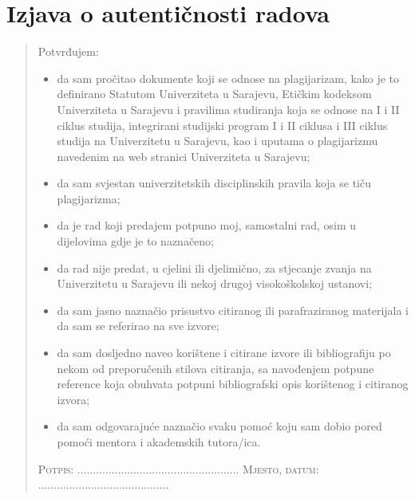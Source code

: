 \chapter*{Izjava o autentičnosti radova}
\begin{SingleSpace}
\begin{quote}
Potvrđujem:
\begin{itemize}

\item da sam pročitao dokumente koji se odnose na plagijarizam, kako je to definirano
Statutom Univerziteta u Sarajevu, Etičkim kodeksom Univerziteta u Sarajevu i pravilima
studiranja koja se odnose na I i II ciklus studija, integrirani studijski program I i II ciklusa i
III ciklus studija na Univerzitetu u Sarajevu, kao i uputama o plagijarizmu navedenim na
web stranici Univerziteta u Sarajevu;

\item da sam svjestan univerzitetskih disciplinskih pravila koja se tiču plagijarizma;

\item da je rad koji predajem potpuno moj, samostalni rad, osim u dijelovima gdje je to
naznačeno;

\item da rad nije predat, u cjelini ili djelimično, za stjecanje zvanja na Univerzitetu u Sarajevu ili
nekoj drugoj visokoškolskoj ustanovi;

\item da sam jasno naznačio prisustvo citiranog ili parafraziranog materijala i da sam se
referirao na sve izvore;

\item da sam dosljedno naveo korištene i citirane izvore ili bibliografiju po nekom od
preporučenih stilova citiranja, sa navođenjem potpune reference koja obuhvata potpuni
bibliografski opis korištenog i citiranog izvora;

\item da sam odgovarajuće naznačio svaku pomoć koju sam dobio pored pomoći
mentora i akademskih tutora/ica.

\end{itemize}

\vspace{1.5cm}
\noindent
\hspace{-0.75cm}\textsc{Potpis: .................................................... Mjesto, datum: ..........................................}
\end{quote}
\end{SingleSpace}
\clearpage